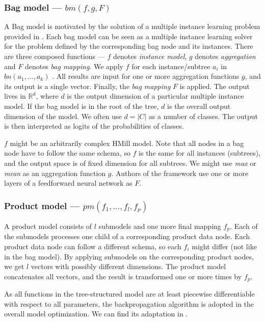 \subsubsection{Bag model --- $bm(f,g,F)$}
A Bag model is motivated by the solution of a multiple instance learning problem provided in \cite{Pevny2016a}. Each bag model can be seen as a multiple instance learning solver for the problem defined by the corresponding bag node and its instances. There are three composed functions --- $f$ denotes \emph{instance model}, $g$ denotes \emph{aggregation} and $F$ denotes \emph{bag mapping}. We apply $f$ for each instance/subtree $a_i$ in $bn(a_1,\dots,a_k)$ . All results are input for one or more aggregation functions $g$, and its output is a single vector. Finally, the \emph{bag mapping} $F$ is applied. The output lives in  $\mathbb{R}^d$, where $d$ is the output dimension of a particular multiple instance model. If the bag model is in the root of the tree, $d$ is the overall output dimension of the model. We often use $d=|C|$ as a number of classes. The output is then interpreted as logits of the probabilities of classes.

$f$ might be an arbitrarily complex HMill model. Note that all nodes in a bag node have to follow the same schema, so $f$ is the same for all instances (subtrees), and the output space is of fixed dimension for all subtrees. We might use \emph{max} or \emph{mean} as an aggregation function $g$. Authors of the framework use one or more layers of a feedforward neural network as $F$.

\subsubsection{Product model --- $pm(f_1,\dots,f_l,f_p)$}
A product model consists of $l$ submodels and one more final mapping $f_p$. Each of the submodels processes one child of a corresponding product data node. Each product data node can follow a different schema, so each $f_i$ might differ (not like in the bag model). By applying submodels on the corresponding product nodes, we get $l$ vectors with possibly different dimensions. The product model concatenates all vectors, and the result is transformed one or more times by $f_p$.

\hfill \break
As all functions in the tree-structured model are at least piecewise differentiable with respect to all parameters, the backpropagation algorithm is adopted in the overall model optimization. We can find its adaptation in \cite{Mandlik2020}.

